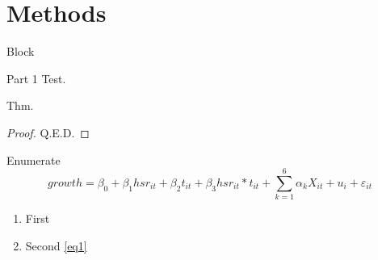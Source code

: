 \documentclass[11pt,utf8]{SWJTUBeamer}
\begin{document}
\section{Methods}

\begin{frame}{Block}
    \begin{block}{Part 1}
        Test.
    \end{block}
    \begin{theorem}[Thm 1]
        Thm.
    \end{theorem}
    \begin{proof}
        Q.E.D.
    \end{proof}
\end{frame}

\begin{frame}{Enumerate}
    \begin{equation}
        growth=\beta_{0}+\beta_{1}hsr_{it}+\beta_{2}t_{it}+\beta_{3}hsr_{it}*t_{it}+\sum^{6}_{k=1}\alpha_{k}X_{it}+u_{i}+\varepsilon_{it}\label{eq1}
    \end{equation}
    \begin{enumerate}
        \item First 
        \item Second \eqref{eq1}
    \end{enumerate}
\end{frame}
\end{document}
